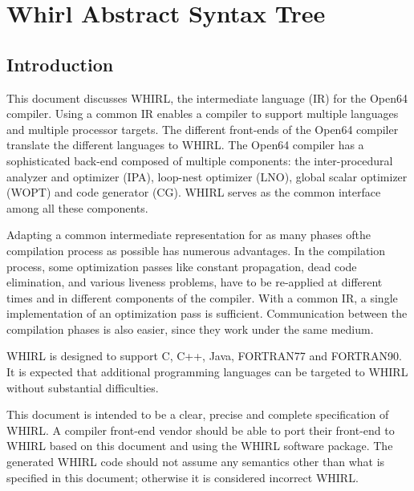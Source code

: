 %
\chapter{Whirl Abstract Syntax Tree}

\section{Introduction}

This document discusses WHIRL, the intermediate language (IR) for
the Open64 compiler. Using a common IR enables a compiler to
support multiple languages and multiple processor targets. The
different front-ends of the Open64 compiler translate the different
languages to WHIRL. The Open64 compiler has a sophisticated back-end
composed of multiple components: the inter-procedural analyzer and
optimizer (IPA), loop-nest optimizer (LNO), global scalar optimizer
(WOPT) and code generator (CG). WHIRL serves as the common interface
among all these components. 

Adapting a common intermediate
representation for as many phases ofthe compilation process as
possible has numerous advantages. In the compilation process, some
optimization passes like constant propagation, dead code elimination,
and various liveness problems, have to be re-applied at different
times and in different components of the compiler. With a common
IR, a single implementation of an optimization pass is sufficient.
Communication between the compilation phases is also easier, since they work 
under the same medium.

WHIRL is designed to support C, C++, Java, FORTRAN77 and FORTRAN90.
It is expected that additional programming languages can be targeted
to WHIRL without substantial difficulties. 

This document is intended
to be a clear, precise and complete specification of WHIRL. A
compiler front-end vendor should be able to port their front-end
to WHIRL based on this document and using the WHIRL software
package. The generated WHIRL code should not assume any semantics
other than what is specified in this document; otherwise it
is considered incorrect WHIRL.

